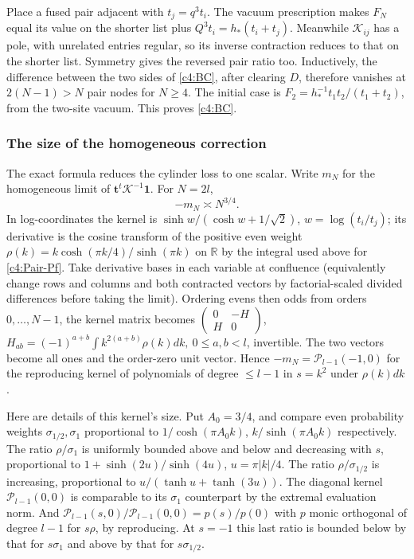 Place a fused pair adjacent with $t_j=q^3t_i$. The vacuum prescription
makes $F_N$ equal its value on the shorter list plus
$Q^3t_i=h_*(t_i+t_j)$. Meanwhile $\mathcal K_{ij}$ has a pole, with
unrelated entries regular, so its inverse contraction reduces to that
on the shorter list. Symmetry gives the reversed pair ratio too.
Inductively, the difference between the two sides of
\eqref{c4:BC}, after clearing $D$, therefore vanishes at
$2(N-1)>N$ pair nodes for $N\ge4$. The initial case is
$F_2=h_*^{-1}t_1t_2/(t_1+t_2)$, from the two-site vacuum.
This proves \eqref{c4:BC}.

\subsubsection{The size of the homogeneous correction}
The exact formula reduces the cylinder loss to one scalar. Write
\(m_N\) for the homogeneous limit of \(\mathbf t^t\mathcal K^{-1}\mathbf1\). For \(N=2l\),
\begin{equation}
                         -m_N\asymp N^{3/4}.                       \label{c4:BM}
\end{equation}
In log-coordinates the kernel is \(\sinh w/(\cosh w+1/\sqrt2)\), \(w=\log(t_i/t_j)\); its derivative is the cosine transform of the positive even weight
\(\rho(k)=k\cosh(\pi k/4)/\sinh(\pi k)\) on \(\mathbb R\) by the integral used above for \eqref{c4:Pair-Pf}. Take derivative bases in each variable at confluence (equivalently change rows and columns and both contracted vectors by factorial-scaled divided differences before taking the limit). Ordering evens then odds from orders \(0,\ldots,N-1\), the kernel matrix becomes \(\left(\begin{smallmatrix}0&-H\\ H&0\end{smallmatrix}\right)\), \(H_{ab}=(-1)^{a+b}\int k^{2(a+b)}\rho(k)dk,\ 0\le a,b<l\), invertible. The two vectors become all ones and the order-zero unit vector. Hence \(-m_N=\mathcal P_{l-1}(-1,0)\) for the reproducing kernel of polynomials of degree \(\le l-1\) in \(s=k^2\) under \(\rho(k)dk\).

Here are details of this kernel's size. Put \(A_0=3/4\), and compare even probability weights \(\sigma_{1/2},\sigma_1\) proportional to \(1/\cosh(\pi A_0 k)\), \(k/\sinh(\pi A_0 k)\) respectively. The ratio \(\rho/\sigma_1\) is uniformly bounded above and below and decreasing with \(s\), proportional to \(1+\sinh(2u)/\sinh(4u)\), \(u=\pi |k|/4\). The ratio \(\rho/\sigma_{1/2}\) is increasing, proportional to \(u/(\tanh u+\tanh(3u))\). The diagonal kernel \(\mathcal P_{l-1}(0,0)\) is comparable to its \(\sigma_1\) counterpart by the extremal evaluation norm. And \(\mathcal P_{l-1}(s,0)/\mathcal P_{l-1}(0,0)=p(s)/p(0)\) with \(p\) monic orthogonal of degree \(l-1\) for \(s\rho\), by reproducing. At \(s=-1\) this last ratio is bounded below by that for \(s\sigma_1\) and above by that for \(s\sigma_{1/2}\).

